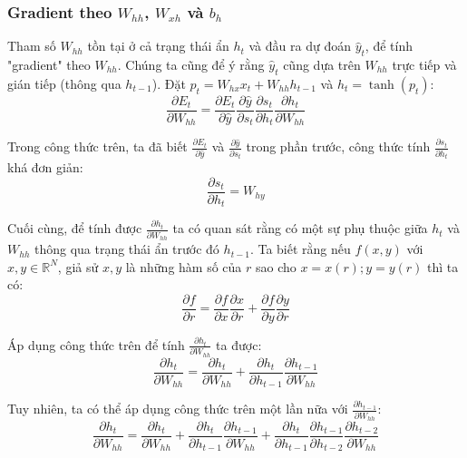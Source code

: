 \subsubsection{Gradient theo $W_{hh}$, $W_{xh}$ và $b_h$}

Tham số $W_{hh}$ tồn tại ở cả trạng thái ẩn $h_t$ và đầu ra dự đoán $\hat{y}_t$, để tính "gradient" theo $W_{hh}$. Chúng ta cũng để ý rằng $\hat{y}_t$ cũng dựa trên $W_{hh}$ trực tiếp và gián tiếp (thông qua $h_{t-1}$). Đặt $p_t = W_{hx}x_t + W_{hh}h_{t-1}$ và $h_t = \tanh(p_t)$:
\begin{equation} \label{gradientWRTSt8}
	\frac{\partial{E_t}}{\partial{W_{hh}}} = \frac{\partial{E_t}}{\partial{\hat{y}}} \frac{\partial{\hat{y}}}{\partial{s_t}} \frac{\partial{s_t}}{\partial{h_t}} \frac{\partial{h_t}}{\partial{W_{hh}}}
\end{equation}

Trong công thức trên, ta đã biết $\frac{\partial{E_t}}{\partial{\hat{y}}}$ và $\frac{\partial{\hat{y}}}{\partial{s_t}}$ trong phần trước, công thức tính $\frac{\partial{s_t}}{\partial{h_t}}$ khá đơn giản:
\begin{equation} \label{gradientWRTSt9}
	\frac{\partial{s_t}}{\partial{h_t}} = W_{hy}
\end{equation}

Cuối cùng, để tính được $\frac{\partial{h_t}}{\partial{W_{hh}}}$ ta có quan sát rằng có một sự phụ thuộc giữa $h_t$ và $W_{hh}$ thông qua trạng thái ẩn trước đó $h_{t-1}$. Ta biết rằng nếu $f(x,y)$ với $x, y \in \mathbb{R}^N$, giả sử $x,y$ là những hàm số của $r$ sao cho $x = x(r); y = y(r)$ thì ta có:
  \begin{equation} \label{gradientWRTSt10}
	\frac{\partial{f}}{\partial{r}} = \frac{\partial{f}}{\partial{x}}\frac{\partial{x}}{\partial{r}} + \frac{\partial{f}}{\partial{y}}\frac{\partial{y}}{\partial{r}}
\end{equation}

Áp dụng công thức trên để tính $\frac{\partial{h_t}}{\partial{W_{hh}}}$ ta được:
\begin{equation} \label{gradientWRTSt11}
	\frac{\partial{h_t}}{\partial{W_{hh}}} = \frac{\partial{h_t}}{\partial{W_{hh}}} + \frac{\partial{h_t}}{\partial{h_{t-1}}} \frac{\partial{h_{t-1}}}{\partial{W_{hh}}}
\end{equation}

Tuy nhiên, ta có thể áp dụng công thức trên một lần nữa với $\frac{\partial{h_{t-1}}}{\partial{W_{hh}}}$:
\begin{equation} \label{gradientWRTSt12}
	\frac{\partial{h_t}}{\partial{W_{hh}}} = \frac{\partial{h_t}}{\partial{W_{hh}}} + \frac{\partial{h_t}}{\partial{h_{t-1}}} \frac{\partial{h_{t-1}}}{\partial{W_{hh}}} + \frac{\partial{h_t}}{\partial{h_{t-1}}} \frac{\partial{h_{t-1}}}{\partial{h_{t-2}}} \frac{\partial{h_{t-2}}}{\partial{W_{hh}}}
\end{equation}


